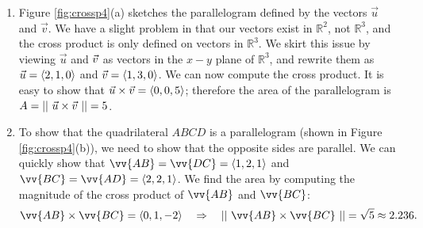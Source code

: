 {\begin{enumerate}
	\item Figure \ref{fig:crossp4}(a) sketches the parallelogram defined by the vectors $\vec u$ and $\vec v$. We have a slight problem in that our vectors exist in $\mathbb{R}^2$, not $\mathbb{R}^3$, and the cross product is only defined on vectors in $\mathbb{R}^3$. We skirt this issue by viewing $\vec u$ and $\vec v$ as vectors in the $x-y$ plane of $\mathbb{R}^3$, and rewrite them as $\vec u = \left\langle 2,1,0\right\rangle$ and $\vec v =\left\langle 1,3,0\right\rangle$. We can now compute the cross product. 
	It is easy to show that $\vec u \times \vec v = \left\langle 0,0,5\right\rangle$; therefore the area of the parallelogram is $A = ||\ \vec u \times \vec v\ || = 5$.
	\item		To show that the quadrilateral $ABCD$ is a parallelogram (shown in Figure \ref{fig:crossp4}(b)), we need to show that the opposite sides are parallel. We can quickly show that $\vv{AB} =\vv{DC} = \la 1,2,1\ra$ and $\vv{BC} = \vv{AD} = \la 2,2,1\ra$. We find the area by computing the magnitude of the cross product of $\vv{AB}$ and $\vv{BC}$:
	$$\vv{AB} \times \vv{BC} = \la 0,1,-2\ra \quad \Rightarrow \quad \norm{\vv{AB}\times\vv{BC}} = \sqrt{5} \approx 2.236.$$
\end{enumerate}
\baselineskip
}\\


